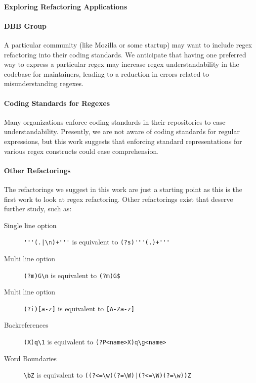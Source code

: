 \paragraph{Exploring Refactoring Applications}

\paragraph{DBB Group}

A particular community (like Mozilla or some startup) may want to include regex refactoring into their coding standards.  We anticipate that having one preferred way to express a particular regex may increase regex understandability in the codebase for maintainers, leading to a reduction in errors related to misunderstanding regexes.



\paragraph{Coding Standards for Regexes}
Many organizations enforce coding standards in their repositories to ease understandability.
Presently, we are not aware of coding standards for regular expressions, but this work suggests that enforcing standard representations for various regex constructs could ease comprehension.


\paragraph{Other Refactorings}
The refactorings we suggest in this work are just a starting point as this is the first work to look
at regex refactoring.
Other refactorings exist that deserve further study, such as:
\begin{description}
\item[Single line option]  \verb!'''(.|\n)+'''! is equivalent to \verb!(?s)'''(.)+'''!
\item[Multi line option]  \verb!(?m)G\n! is equivalent to \verb!(?m)G$!
\item[Multi line option]  \verb!(?i)[a-z]! is equivalent to \verb![A-Za-z]!
\item[Backreferences]  \verb!(X)q\1! is equivalent to \verb!(?P<name>X)q\g<name>!
\item[Word Boundaries]  \verb!\bZ! is equivalent to \verb!((?<=\w)(?=\W)|(?<=\W)(?=\w))Z!
\end{description}

